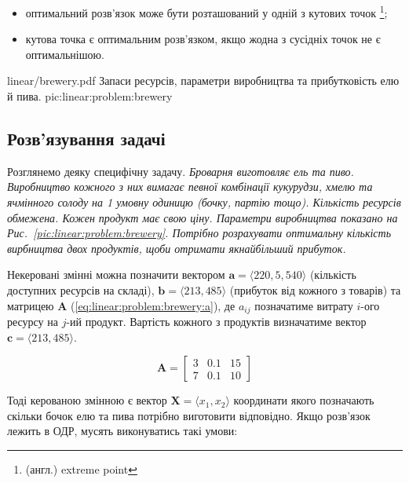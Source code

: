 \documentclass[\main/book.tex]{subfiles}
\begin{document}
\begin{conclusions}
\begin{itemize}
 \item оптимальний розв'язок може бути розташований у одній з кутових точок \footnote{(англ.) extreme point};
 \item кутова точка є оптимальним розв'язком, якщо жодна з сусідніх точок не є оптимальнішою.
\end{itemize}
\label{conclusion:linear:optimal_solution}
\end{conclusions}

\illustration
 {linear/brewery.pdf}
 {Запаси ресурсів, параметри ви\-роб\-ниц\-тва та прибутковість елю й пива.}
 {pic:linear:problem:brewery}

\subsection{Розв'язування задачі}

Розглянемо деяку специфічну задачу. \textit{Броварня виготовляє ель та пиво. Виробництво кожного з них вимагає певної комбінації кукурудзи, хмелю та ячмінного солоду на 1 умовну одиницю (бочку, партію тощо). Кількість ресурсів обмежена. Кожен продукт має свою ціну. Параметри виробництва показано на Рис.~\ref{pic:linear:problem:brewery}. Потрібно розрахувати оптимальну кількість вирбництва двох продуктів, щоби отримати якнайбільший прибуток.}

Некеровані змінні можна позначити вектором $\mathbf{a} = {\langle 220, 5, 540 \rangle}$ (кількість доступних ресурсів на складі), $\mathbf{b} = {\langle 213, 485 \rangle}$ (прибуток від кожного з товарів) та матрицею $\mathbf{A}$ (\ref{eq:linear:problem:brewery:a}), де $a_{ij}$ позначатиме витрату $i$-ого ресурсу на $j$-ий продукт. Вартість кожного з продуктів визначатиме вектор $\mathbf{c} = {\langle 213, 485 \rangle}$.

\begin{equation}
 \mathbf{A} = \begin{bmatrix}
               3 & 0.1 & 15 \\
               7 & 0.1 & 10
              \end{bmatrix}
 \label{eq:linear:problem:brewery:a}
\end{equation}

Тоді керованою змінною є вектор $\mathbf{X} = \langle x_1, x_2 \rangle$ координати якого позначають скільки бочок елю та пива потрібно виготовити відповідно. Якщо розв'язок лежить в ОДР, мусять виконуватись такі умови:
\end{document}

